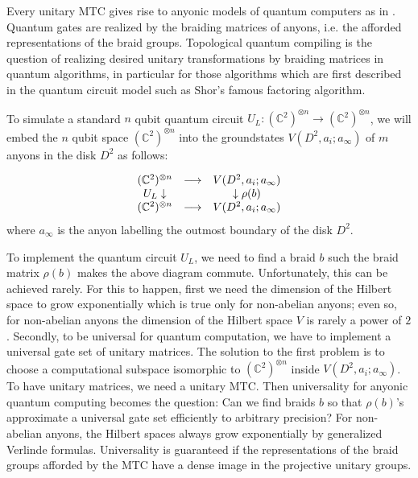 \documentclass[12pt,psamsfonts]{amsart}
\numberwithin{equation}{section}
\theoremstyle{definition}
\begin{document}
Every unitary MTC gives rise to anyonic models of quantum
computers as in \cite{FKLW}.  Quantum gates are realized by the
braiding matrices of anyons, i.e. the afforded representations of
the braid groups. Topological quantum compiling is the question of
realizing desired unitary transformations by braiding matrices in
quantum algorithms, in particular for those algorithms which are
first described in the quantum circuit model such as Shor's famous
factoring algorithm.

\iffalse

To simulate a standard $n$ qubit quantum circuit
$U_L:({\mathbb{C}^2})^{\otimes n} \rightarrow
 ({\mathbb{C}^2})^{\otimes n} $, we will embed the $n$ qubit space
$({\mathbb{C}^2})^{\otimes n}$ into the groundstates
$V(D^2,a_i;a_{\infty})$ of $m$ anyons in the disk $D^2$ as
follows:

\begin{displaymath}
\begin{matrix} ({\mathbb{C}^2})^{\otimes n} & \longrightarrow
& V(D^2,a_i;a_{\infty})\cr {U_L} \downarrow & & \downarrow
{\rho(b)}\cr ({\mathbb{C}^2})^{\otimes n} & \longrightarrow &
V(D^2,a_i;a_{\infty})
\end{matrix}
\end{displaymath}
where $a_{\infty}$ is the anyon labelling the outmost boundary of
the disk $D^2$.

To implement the quantum circuit $U_L$, we need to find a braid
$b$ such the braid matrix $\rho(b)$ makes the above diagram
commute. Unfortunately, this can be achieved rarely.  For this to
happen, first we need the dimension of the Hilbert space to grow
exponentially which is true only for non-abelian anyons; even so,
for non-abelian anyons the dimension of the Hilbert space $V$ is
rarely a power of $2$. Secondly, to be universal for quantum
computation, we have to implement a universal gate set of unitary
matrices.  The solution to the first problem is to choose a
computational subspace isomorphic to $({\mathbb{C}^2})^{\otimes
n}$ inside $V(D^2,a_i;a_{\infty})$. To have unitary matrices, we
need a unitary MTC.  Then universality for anyonic quantum
computing becomes the question: Can we find braids $b$ so that
$\rho(b)$'s approximate a universal gate set efficiently to
arbitrary precision?  For non-abelian anyons, the Hilbert spaces
always grow exponentially by generalized Verlinde formulas.
Universality is guaranteed if the representations of the braid
groups afforded by the MTC have a dense image in the projective
unitary groups.
\end{document}
